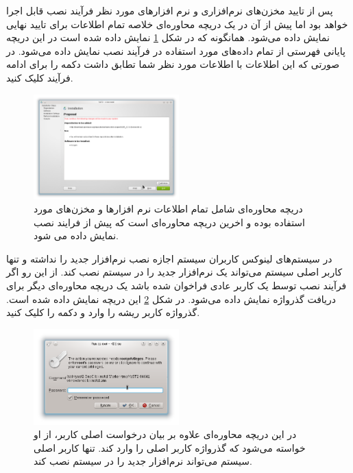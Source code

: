 پس از تایید مخزن‌های نرم‌افزاری و نرم افزارهای مورد نظر فرآیند نصب قابل اجرا
خواهد بود اما پیش از آن در یک دریچه محاوره‌ای خلاصه تمام اطلاعات برای تایید
نهایی نمایش داده می‌شود. همانگونه که در شکل \ref{images/write/graph/mscgen/install-OpenSuse-4}
نمایش داده شده است در این دریچه پایانی فهرستی از تمام داده‌های مورد استفاده در
فرآیند نصب نمایش داده می‌شود. در صورتی که این اطلاعات با اطلاعات مورد نظر شما
تطابق داشت دکمه  را برای ادامه فرآیند کلیک کنید.

\begin{figure}
	\centering
	\includegraphics[width=0.5\textwidth]{images/write/graph/mscgen/install-OpenSuse-4}
	\caption[اطلاعات کلی فرآیند نصب نرم‌افزار ]{
		دریچه محاوره‌ای شامل تمام اطلاعات نرم افزارها و مخزن‌های مورد استفاده بوده و
		اخرین دریچه محاوره‌ای است که پیش از فرایند نصب نمایش داده می شود.
	}
	\label{images/write/graph/mscgen/install-OpenSuse-4}
\end{figure}

در سیستم‌های لینوکس کاربران سیستم اجازه نصب نرم‌افزار جدید را نداشته و تنها
کاربر اصلی سیستم می‌تواند یک نرم‌افزار جدید را در سیستم نصب کند. از این رو
اگر فرآیند نصب توسط یک کاربر عادی فراخوان شده باشد یک دریچه محاوره‌ای دیگر برای
دریافت گذرواژه نمایش داده می‌شود. در شکل
\ref{images/write/graph/mscgen/install-OpenSuse-5} این دریچه نمایش داده شده
است. گذرواژه کاربر ریشه را وارد و دکمه  را کلیک کنید.

\begin{figure}
	\centering
	\includegraphics[width=0.5\textwidth]{images/write/graph/mscgen/install-OpenSuse-5}
	\caption[احراز اصالت برای نصب نرم‌افزار ]{
		در این دریچه محاوره‌ای علاوه بر بیان درخواست اصلی کاربر، از او خواسته می‌شود
		که گذرواژه کاربر اصلی را وارد کند. تنها کاربر اصلی سیستم می‌تواند نرم‌افزار
		جدید را در سیستم نصب کند.
	}
	\label{images/write/graph/mscgen/install-OpenSuse-5}
\end{figure}

